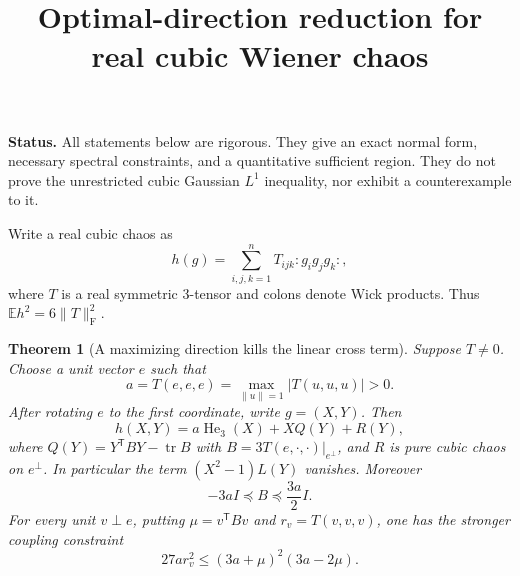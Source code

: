 \documentclass[11pt]{article}
\title{Optimal-direction reduction for real cubic Wiener chaos}
\author{}
\date{}
\newtheorem{theorem}{Theorem}
\newcommand{\E}{\mathbb E}
\newcommand{\He}{\operatorname{He}}
\begin{document}
\maketitle
\noindent\textbf{Status.} All statements below are rigorous. They give an exact
normal form, necessary spectral constraints, and a quantitative sufficient
region. They do not prove the unrestricted cubic Gaussian $L^1$ inequality,
nor exhibit a counterexample to it.

Write a real cubic chaos as
\[
 h(g)=\sum_{i,j,k=1}^n T_{ijk}:g_i g_j g_k:,
\]
where $T$ is a real symmetric $3$-tensor and colons denote Wick products.
Thus $\E h^2=6\|T\|_{\mathrm F}^2$.

\begin{theorem}[A maximizing direction kills the linear cross term]
Suppose $T\ne0$. Choose a unit vector $e$ such that
\[
 a=T(e,e,e)=\max_{\|u\|=1}|T(u,u,u)|>0.
\]
After rotating $e$ to the first coordinate, write $g=(X,Y)$. Then
\[
 h(X,Y)=a\He_3(X)+XQ(Y)+R(Y),
\]
where $Q(Y)=Y^{\mathsf T}BY-\operatorname{tr}B$ with
$B=3T(e,\cdot,\cdot)|_{e^\perp}$, and $R$ is pure cubic chaos on $e^\perp$.
In particular the term $(X^2-1)L(Y)$ vanishes. Moreover
\[
 -3aI\preceq B\preceq \frac{3a}{2}I.
\]
For every unit $v\perp e$, putting
$\mu=v^{\mathsf T}Bv$ and $r_v=T(v,v,v)$, one has the stronger coupling
constraint
\[
 \boxed{27a r_v^2\leq(3a+\mu)^2(3a-2\mu).}
\]
\end{theorem}
\end{document}

